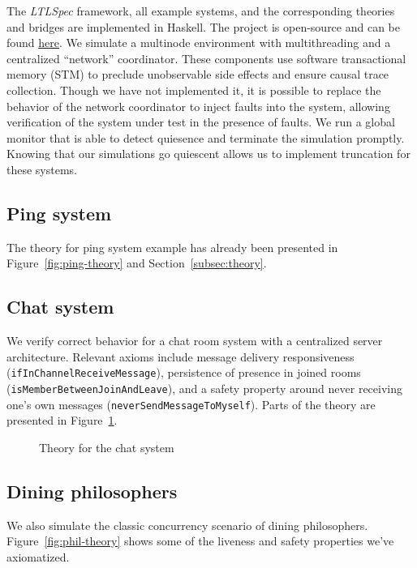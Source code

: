 \documentclass[format=acmsmall, nonacm=true, review=true, screen=true]{acmart}
\newcommand{\mycaption}[1]{\Description{#1}\caption{#1}}
\newcommand{\ltlspec}{\textit{LTLSpec}\xspace}
\begin{document}
The \ltlspec framework, all example systems, and the corresponding theories and bridges are implemented in Haskell.
The project is open-source and can be found \href{https://github.com/ejconlon/ltlspec}{here}.
We simulate a multinode environment with multithreading and a centralized ``network'' coordinator.
These components use software transactional memory (STM) to preclude unobservable side effects and ensure causal trace collection.
Though we have not implemented it, it is possible to replace the behavior of the network coordinator to inject faults into the system, allowing verification of the system under test in the presence of faults.
We run a global monitor that is able to detect quiesence and terminate the simulation promptly.
Knowing that our simulations go quiescent allows us to implement truncation for these systems.

\subsection{Ping system}

The theory for ping system example has already been presented in Figure~\ref{fig:ping-theory} and Section~\ref{subsec:theory}.

\subsection{Chat system}

We verify correct behavior for a chat room system with a centralized server architecture.
Relevant axioms include message delivery responsiveness (\texttt{ifInChannelReceiveMessage}), persistence of presence in joined rooms (\texttt{isMemberBetweenJoinAndLeave}), and a safety property around never receiving one's own messages (\texttt{neverSendMessageToMyself}). Parts of the theory are presented in Figure~\ref{fig:chat-theory}.

\begin{figure}[ht]
  {
    \fontsize{10}{12}\selectfont
    
  }
  \mycaption{Theory for the chat system}
  \label{fig:chat-theory}
\end{figure}

\subsection{Dining philosophers}

We also simulate the classic concurrency scenario of dining philosophers. Figure~\ref{fig:phil-theory} shows some of the liveness and safety properties we've axiomatized.
\end{document}
